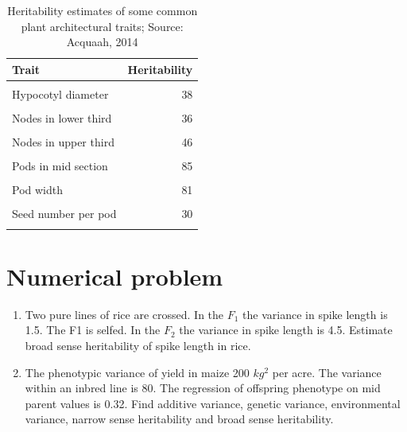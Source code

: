 \documentclass[11pt,ignorenonframetext,aspectratio=169]{beamer}
\begin{document}
\begin{frame}{}
\protect\hypertarget{section-11}{}
\begin{table}

\caption{\label{tab:heritability-estimates}Heritability estimates of some common plant architectural traits; Source: Acquaah, 2014}
\centering
\begin{tabular}[t]{lr}
\toprule
Trait & Heritability\\
\midrule
\cellcolor{gray!6}{Plant height} & \cellcolor{gray!6}{45}\\
Hypocotyl diameter & 38\\
\cellcolor{gray!6}{Number of branches/plant} & \cellcolor{gray!6}{56}\\
Nodes in lower third & 36\\
\cellcolor{gray!6}{Nodes in mid section} & \cellcolor{gray!6}{45}\\
\addlinespace
Nodes in upper third & 46\\
\cellcolor{gray!6}{Pods in lower third} & \cellcolor{gray!6}{62}\\
Pods in mid section & 85\\
\cellcolor{gray!6}{Pods in upper third} & \cellcolor{gray!6}{80}\\
Pod width & 81\\
\addlinespace
\cellcolor{gray!6}{Pod length} & \cellcolor{gray!6}{67}\\
Seed number per pod & 30\\
\cellcolor{gray!6}{100 seed weight} & \cellcolor{gray!6}{77}\\
\bottomrule
\end{tabular}
\end{table}
\end{frame}

\hypertarget{numerical-problem}{%
\section{Numerical problem}\label{numerical-problem}}

\begin{frame}{}
\protect\hypertarget{section-12}{}
\begin{enumerate}
\item
  Two pure lines of rice are crossed. In the \(F_1\) the variance in
  spike length is 1.5. The F1 is selfed. In the \(F_2\) the variance in
  spike length is 4.5. Estimate broad sense heritability of spike length
  in rice.
\item
  The phenotypic variance of yield in maize 200 \(kg^2\) per acre. The
  variance within an inbred line is 80. The regression of offspring
  phenotype on mid parent values is 0.32. Find additive variance,
  genetic variance, environmental variance, narrow sense heritability
  and broad sense heritability.
\end{enumerate}
\end{frame}
\end{document}

